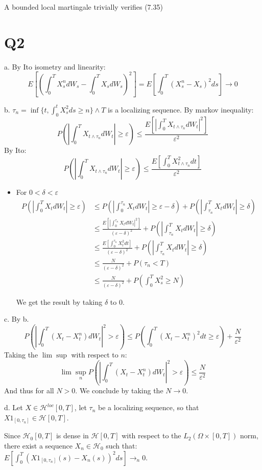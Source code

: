 \documentclass[11pt]{article}
\begin{document}
A bounded local martingale trivially verifies (7.35)

\section{Q2}
\label{sec:orgheadline3}
a. By Ito isometry and linearity:
$$E[ (\int_0^T X_s^n dW_s - \int_0^T X_s dW_s)^2 ] =  E[ \int_0^T (X_s^n - X_s)^2 ds ] \rightarrow 0$$

b.  \(\tau_n = \inf \{t ,  \int_0^t X_s^2 ds \ge n\} \wedge T\) is a localizing sequence.
By markov inequality:
$$P(|\int_0^T X_{t \wedge \tau_n} dW_t| \ge \varepsilon) \le \frac{E[|\int_0^T X_{t \wedge \tau_n} dW_t|^2]}{\varepsilon^2}$$
By Ito:
$$P(|\int_0^T X_{t \wedge \tau_n} dW_t| \ge \varepsilon) \le \frac{E[\int_0^T X^2_{t \wedge \tau_n} dt]}{\varepsilon^2}$$

\begin{itemize}
\item For \(0 < \delta < \varepsilon\)
\begin{align}
P(|\int_0^T X_t dW_t| \ge \varepsilon)
&\le P(|\int_0^{\tau_n} X_t dW_t| \ge \varepsilon-\delta) + P(|\int_{\tau_n}^T X_t dW_t| \ge \delta)
\\&\le \frac{E[|\int_0^{\tau_n} X_t dW_t|^2]}{(\varepsilon-\delta)^2} + P(|\int_{\tau_n}^T X_t dW_t| \ge \delta)
\\&\le \frac{E[\int_0^{\tau_n} X_t^2 dt]}{(\varepsilon-\delta)^2} + P(|\int_{\tau_n}^T X_t dW_t| \ge \delta)
\\&\le \frac{N}{(\varepsilon-\delta)^2} +  P(\tau_n < T)
\\&\le \frac{N}{(\varepsilon-\delta)^2} +  P(\int_0^T X_s^2 \ge N)
\end{align}

We get the result by taking  \(\delta\) to 0.
\end{itemize}

c. By b.
$$P(|\int_0^T (X_t - X^n_t) dW_t|^2 > \varepsilon) \le P(\int_0^T (X_t - X^n_t)^2 dt \ge \varepsilon) + \frac N{\varepsilon^2}$$
Taking the \(\lim\sup\) with respect to \(n\):
  $$\lim\sup_n P(|\int_0^T (X_t - X^n_t) dW_t|^2 > \varepsilon) \le \frac N{\varepsilon^2}$$
  And thus for all \(N > 0\). We conclude by taking the \(N \rightarrow 0\).

d. Let \(X \in \mathcal H^{loc}[0, T]\), let \(\tau_n\) be a localizing sequence, so that \(X1_{[0, \tau_n]} \in \mathcal H[0, T]\).

Since \(\mathcal H_0[0, T]\) is dense in \(\mathcal H[0, T]\) with respect to the \(L_2(\Omega \times [0, T])\) norm, there exist a sequence \(X_n \in \mathcal H_0\) such that:
\(E[\int_0^T (X1_{[0, \tau_n]}(s) - X_n(s))^2 ds] \rightarrow_n 0\).
\end{document}
